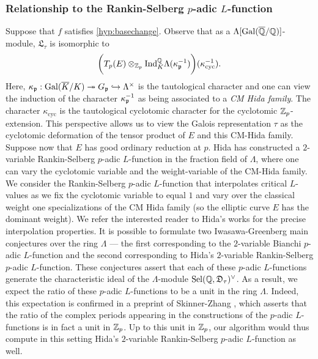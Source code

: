 \documentclass[a4paper,11pt]{article}
\DeclareMathOperator{\Gal}{Gal}
\numberwithin{equation}{section}
\newcommand{\Galois}[2]{\Gal({#1}/{#2})}
\newcommand{\Ind}{\mathrm{Ind}}
\newcommand{\Sel}{\mathrm{Sel}}
\newcommand{\LLL}{\mathfrak{L}}
\newcommand{\DDD}{\mathfrak{D}}
\begin{document}
\subsubsection{Relationship to the Rankin-Selberg $p$-adic $L$-function}
Suppose that $f$ satisfies \ref{hyp:basechange}. Observe that as a $\Lambda[\Galois{\overline{\Q}}{\Q}]$-module, $\LLL_\tau$ is isomorphic to
\begin{align*}
\bigg(T_p(E) \otimes_{\Z_p} \Ind^\Q_K \Lambda(\kappa_{\pri}^{-1})\bigg) (\kappa_{\mathrm{cyc}}^{-1}).
\end{align*}
Here, $\kappa_\pri:\Galois{\overline{K}}{K} \twoheadrightarrow G_\pri \hookrightarrow \Lambda^\times$ is the tautological character and one can view the induction of the character $\kappa_{\mathfrak{p}}^{-1}$ as being associated to a \textit{CM Hida family}. The character $\kappa_{\mathrm{cyc}}$ is the tautological cyclotomic character for the cyclotomic $\mathbb{Z}_p$-extension. This perspective allows us to view the Galois representation $\tau$ as the cyclotomic deformation of the tensor product of $E$ and this CM-Hida family. Suppose now that $E$ has good ordinary reduction at $p$. Hida has constructed a $2$-variable Rankin-Selberg $p$-adic $L$-function in the fraction field of $\Lambda$, where one can vary the cyclotomic variable and the weight-variable of the CM-Hida family. We consider the Rankin-Selberg $p$-adic $L$-function that interpolates critical $L$-values as we fix the cyclotomic variable to equal $1$ and vary over the classical weight one specializations of the CM Hida family (so the elliptic curve $E$ has the dominant weight). We refer the interested reader to Hida's works \cite{HidE,hida1985ap,hida1988p,Hid96} for the precise interpolation properties. It is possible to formulate two Iwasawa-Greenberg main conjectures over the ring $\Lambda$ --- the first corresponding to the $2$-variable Bianchi $p$-adic $L$-function and the second corresponding to Hida's $2$-variable Rankin-Selberg $p$-adic $L$-function. These conjectures assert that each of these $p$-adic $L$-functions generate the characteristic ideal of the $\Lambda$-module $\Sel(\Q,\DDD_\tau)^\vee$. As a result, we expect the ratio of these $p$-adic $L$-functions to be a unit in the ring $\Lambda$. Indeed, this expectation is confirmed in a preprint of Skinner-Zhang \cite[Lemma  9.5]{SkinnerZhang}, which asserts that the ratio of the complex periods appearing in the constructions of the $p$-adic $L$-functions is in fact a unit in $\mathbb{Z}_p$. Up to this unit in $\mathbb{Z}_p$, our algorithm would thus compute in this setting Hida's $2$-variable Rankin-Selberg $p$-adic $L$-function as well.
\end{document}
